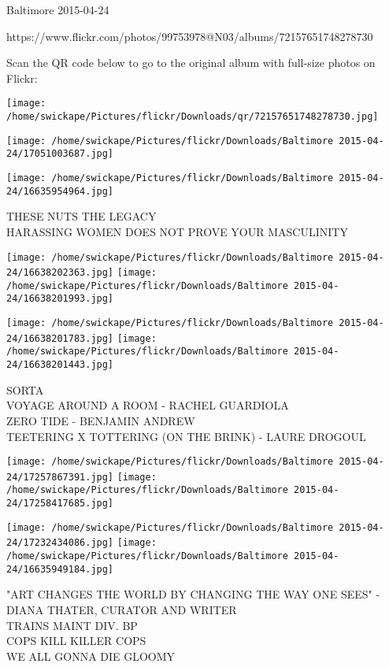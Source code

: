 \documentclass[10pt,letterpaper]{article}
\begin{document}
Baltimore 2015-04-24

https://www.flickr.com/photos/99753978@N03/albums/72157651748278730

Scan the QR code below to go to the original album with full-size photos on Flickr:

\texttt{[image: /home/swickape/Pictures/flickr/Downloads/qr/72157651748278730.jpg]}
\pagebreak

\texttt{[image: /home/swickape/Pictures/flickr/Downloads/Baltimore 2015-04-24/17051003687.jpg]}

\vspace{0.25in}
\texttt{[image: /home/swickape/Pictures/flickr/Downloads/Baltimore 2015-04-24/16635954964.jpg]}

THESE NUTS THE LEGACY\\
HARASSING WOMEN DOES NOT PROVE YOUR MASCULINITY\\
\pagebreak

\texttt{[image: /home/swickape/Pictures/flickr/Downloads/Baltimore 2015-04-24/16638202363.jpg]}
\texttt{[image: /home/swickape/Pictures/flickr/Downloads/Baltimore 2015-04-24/16638201993.jpg]}

\texttt{[image: /home/swickape/Pictures/flickr/Downloads/Baltimore 2015-04-24/16638201783.jpg]}
\texttt{[image: /home/swickape/Pictures/flickr/Downloads/Baltimore 2015-04-24/16638201443.jpg]}

SORTA\\
VOYAGE AROUND A ROOM {-} RACHEL GUARDIOLA\\
ZERO TIDE {-} BENJAMIN ANDREW\\
TEETERING X TOTTERING (ON THE BRINK) {-} LAURE DROGOUL\\
\pagebreak

\texttt{[image: /home/swickape/Pictures/flickr/Downloads/Baltimore 2015-04-24/17257867391.jpg]}
\texttt{[image: /home/swickape/Pictures/flickr/Downloads/Baltimore 2015-04-24/17258417685.jpg]}

\texttt{[image: /home/swickape/Pictures/flickr/Downloads/Baltimore 2015-04-24/17232434086.jpg]}
\texttt{[image: /home/swickape/Pictures/flickr/Downloads/Baltimore 2015-04-24/16635949184.jpg]}

"ART CHANGES THE WORLD BY CHANGING THE WAY ONE SEES" {-} DIANA THATER, CURATOR AND WRITER\\
TRAINS MAINT DIV. BP\\
COPS KILL KILLER COPS\\
WE ALL GONNA DIE GLOOMY\\
\pagebreak
\end{document}
